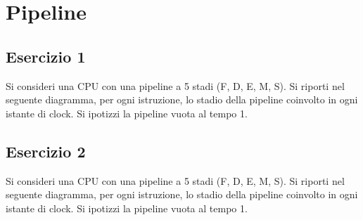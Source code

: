 \documentclass[a4paper]{article}
\theoremstyle{break}
\theoremstyle{break}
\theoremstyle{break}
\theoremstyle{break}
\begin{document}


\tableofcontents
\pagebreak

\section{Pipeline}
\subsection{Esercizio 1}
Si consideri una CPU con una pipeline a 5 stadi (F, D, E, M, S). Si riporti nel seguente 
diagramma, per ogni istruzione, lo stadio della pipeline coinvolto in ogni istante di 
clock. Si ipotizzi la pipeline vuota al tempo 1.

\begin{table}[H]
  \centering
\end{table}

\subsection{Esercizio 2}
Si consideri una CPU con una pipeline a 5 stadi (F, D, E, M, S). Si riporti nel seguente diagramma,
per ogni istruzione, lo stadio della pipeline coinvolto in ogni istante di clock. Si ipotizzi la pipeline
vuota al tempo 1.

\begin{table}[H]
  \centering
\end{table}
\end{document}
